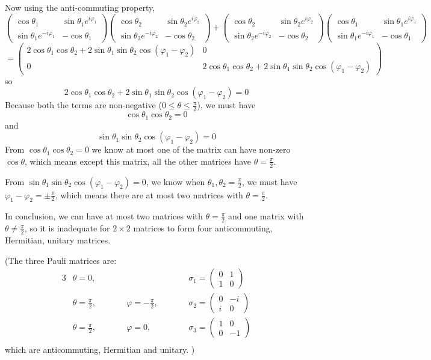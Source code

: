 \documentclass[a4paper]{article}
\begin{document}
Now using the anti-commuting property,
\[
\begin{pmatrix}
\cos\theta_1&\sin\theta_1 e^{i\varphi_1}\\
\sin\theta_1 e^{-i\varphi_1}& -\cos\theta_1
\end{pmatrix}
\begin{pmatrix}
\cos\theta_2&\sin\theta_2 e^{i\varphi_2}\\
\sin\theta_2 e^{-i\varphi_2}& -\cos\theta_2
\end{pmatrix}+
\begin{pmatrix}
\cos\theta_2&\sin\theta_2 e^{i\varphi_2}\\
\sin\theta_2 e^{-i\varphi_2}& -\cos\theta_2
\end{pmatrix}
\begin{pmatrix}
\cos\theta_1&\sin\theta_1 e^{i\varphi_1}\\
\sin\theta_1 e^{-i\varphi_1}& -\cos\theta_1
\end{pmatrix}\]
\[
=\begin{pmatrix}
2\cos\theta_1\cos\theta_2+2\sin\theta_1\sin\theta_2\cos(\varphi_1-\varphi_2)& 0\\
0& 2\cos\theta_1\cos\theta_2+2\sin\theta_1\sin\theta_2\cos(\varphi_1-\varphi_2)
\end{pmatrix}
\]
so 
\[
2\cos\theta_1\cos\theta_2+2\sin\theta_1\sin\theta_2\cos(\varphi_1-\varphi_2)=0
\]
Because both the terms are non-negative ($0\leq\theta\leq\frac{\pi}{2}$), we must have \[\cos\theta_1\cos\theta_2=0\] and \[\sin\theta_1\sin\theta_2\cos(\varphi_1-\varphi_2)=0\]
From $\cos\theta_1\cos\theta_2=0$ we know at most one of the matrix can have non-zero $\cos\theta$, which means except this matrix, all the other matrices have $\theta=\frac{\pi}{2}$.

From $\sin\theta_1\sin\theta_2\cos(\varphi_1-\varphi_2)=0$, we know when $\theta_1,\theta_2=\frac{\pi}{2}$, we must have $\varphi_1-\varphi_2=\pm\frac{\pi}{2}$, which means there are at most two matrices with $\theta=\frac{\pi}{2}$.

In conclusion, we can have at most two matrices with $\theta=\frac{\pi}{2}$ and one matrix with $\theta\neq\frac{\pi}{2}$, so it is inadequate for $2\times2$ matrices to form four anticommuting, Hermitian,
unitary matrices.
\medskip

(The three Pauli matrices are:
\begin{alignat*}{3}
    & \theta=0 ,\qquad&& && \sigma_1=\begin{pmatrix}0&1\\1&0\end{pmatrix}\\
    & \theta=\frac{\pi}{2},\qquad&& \varphi=-\frac{\pi}{2},\qquad&&\sigma_2=\begin{pmatrix}0&-i\\i&0\end{pmatrix}\\
    & \theta=\frac{\pi}{2},\qquad && \varphi=0 ,\qquad&& \sigma_3=
\begin{pmatrix}
1&0\\0&-1
\end{pmatrix}\\
\end{alignat*}
which are anticommuting, Hermitian and
unitary.
)
\end{document}
